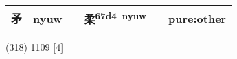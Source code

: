 \documentclass[14pt,a4paper]{scrartcl}
\begin{document}
\begin{longtable}[c]{@{}llllll@{}}
\begin{minipage}[t]{0.14\columnwidth}\raggedright\strut
矛
\strut\end{minipage} &
\begin{minipage}[t]{0.14\columnwidth}\raggedright\strut
nyuw
\strut\end{minipage} &
\begin{minipage}[t]{0.14\columnwidth}\raggedright\strut
\strut\end{minipage} &
\begin{minipage}[t]{0.14\columnwidth}\raggedright\strut
柔\textsuperscript{67d4~nyuw}
\strut\end{minipage} &
\begin{minipage}[t]{0.14\columnwidth}\raggedright\strut
\strut\end{minipage} &
\begin{minipage}[t]{0.14\columnwidth}\raggedright\strut
pure:other
\strut\end{minipage}\tabularnewline
\bottomrule
\end{longtable}

(318) 1109 {[}4{]}
\end{document}
